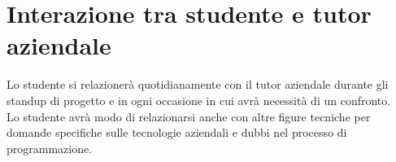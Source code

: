 \section*{Interazione tra studente e tutor aziendale}

Lo studente si relazionerà quotidianamente con il tutor aziendale durante gli standup di progetto e in ogni occasione in cui avrà necessità di un confronto. \\

Lo studente avrà modo di relazionarsi anche con altre figure tecniche per domande specifiche sulle tecnologie aziendali e dubbi nel processo di programmazione.
